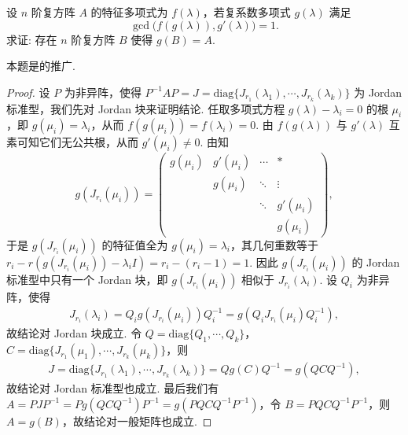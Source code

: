 \documentclass[../../main.tex]{subfiles}%
\begin{document}
\begin{example}
设 \( n \) 阶复方阵 \( A \) 的特征多项式为 \( f(\lambda) \)，若复系数多项式 \( g(\lambda) \) 满足
\[
\gcd\bigl(f(g(\lambda)), g'(\lambda)\bigr) = 1.
\]
求证: 存在 \( n \) 阶复方阵 \( B \) 使得 \( g(B) = A \).
\end{example}
\begin{note}
本题是的推广.
\end{note}
\begin{proof}
设 \( P \) 为非异阵，使得 \( P^{-1}AP = J = \mathrm{diag}\{J_{r_1}(\lambda_1), \cdots, J_{r_k}(\lambda_k)\} \) 为 Jordan 标准型，我们先对 Jordan 块来证明结论. 任取多项式方程 \( g(\lambda) - \lambda_i = 0 \) 的根 \( \mu_i \)，即 \( g(\mu_i) = \lambda_i \)，从而 \( f(g(\mu_i)) = f(\lambda_i) = 0 \). 由 \( f(g(\lambda)) \) 与 \( g'(\lambda) \) 互素可知它们无公共根，从而 \( g'(\mu_i) \neq 0 \). 由知
\[
g(J_{r_i}(\mu_i)) = \begin{pmatrix} 
g(\mu_i) & g'(\mu_i) & \cdots & * \\
& g(\mu_i) & \ddots & \vdots \\
& & \ddots & g'(\mu_i) \\
& & & g(\mu_i)
\end{pmatrix},
\]
于是 \( g(J_{r_i}(\mu_i)) \) 的特征值全为 \( g(\mu_i)=\lambda_i \)，其几何重数等于 \( r_i - r(g(J_{r_i}(\mu_i)) - \lambda_i I) = r_i - (r_i - 1) = 1 \). 因此 \( g(J_{r_i}(\mu_i)) \) 的 Jordan 标准型中只有一个 Jordan 块，即 \( g(J_{r_i}(\mu_i)) \) 相似于 \( J_{r_i}(\lambda_i) \). 设 \( Q_i \) 为非异阵，使得 
\begin{align*}
J_{r_i}(\lambda_i) = Q_i g(J_{r_i}(\mu_i)) Q_i^{-1} = g(Q_i J_{r_i}(\mu_i) Q_i^{-1}),
\end{align*}
故结论对 Jordan 块成立. 令 \( Q = \mathrm{diag}\{Q_1, \cdots, Q_k\} \)，\( C = \mathrm{diag}\{J_{r_1}(\mu_1), \cdots, J_{r_k}(\mu_k)\} \)，则
\begin{align*}
J = \mathrm{diag}\{J_{r_1}(\lambda_1), \cdots, J_{r_k}(\lambda_k)\} = Q g(C) Q^{-1} = g(Q C Q^{-1}),
\end{align*}
故结论对 Jordan 标准型也成立. 最后我们有 \( A = P J P^{-1} = P g(Q C Q^{-1}) P^{-1} = g(P Q C Q^{-1} P^{-1}) \)，令 \( B = P Q C Q^{-1} P^{-1} \)，则 \( A = g(B) \)，故结论对一般矩阵也成立. 
\end{proof}
\end{document}
